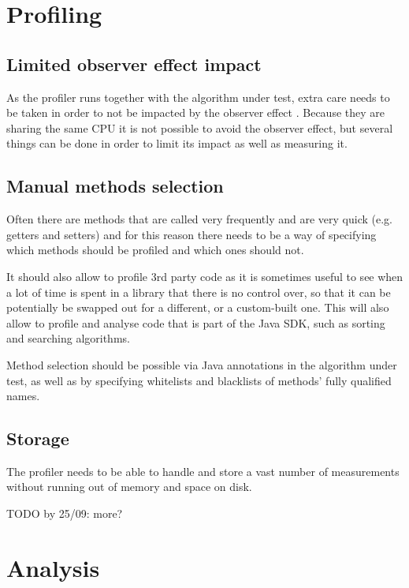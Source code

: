 \section{Profiling}
\label{sec:requirementanalysis:profiling}

\subsection{Limited observer effect impact}
As the profiler runs together with the algorithm under test, extra care needs to be taken in order to not be impacted by the observer effect \cite{MSH08}. Because they are sharing the same CPU it is not possible to avoid the observer effect, but several things can be done in order to limit its impact as well as measuring it.

\subsection{Manual methods selection}
Often there are methods that are called very frequently and are very quick (e.g. getters and setters) and for this reason there needs to be a way of specifying which methods should be profiled and which ones should not.

\noindent It should also allow to profile 3rd party code as it is sometimes useful to see when a lot of time is spent in a library that there is no control over, so that it can be potentially be swapped out for a different, or a custom-built one. This will also allow to profile and analyse code that is part of the Java SDK, such as sorting and searching algorithms.

\noindent Method selection should be possible via Java annotations in the algorithm under test, as well as by specifying whitelists and blacklists of methods' fully qualified names.

\subsection{Storage}
The profiler needs to be able to handle and store a vast number of measurements without running out of memory and space on disk.


\noindent TODO by 25/09: more?

\section{Analysis}
\label{sec:requirementanalysis:analysis}

